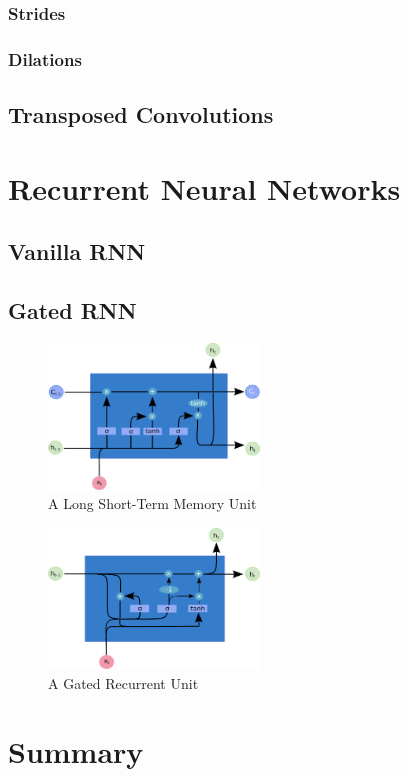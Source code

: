 \subsubsection{Strides}
\subsubsection{Dilations}
\subsection{Transposed Convolutions}


\section{Recurrent Neural Networks}
\subsection{Vanilla RNN}
\subsection{Gated RNN}

\begin{figure}
	\centering
	\includegraphics[width=0.5\textwidth]{Figs/intro2dl/LSTM.png}
	
	\caption{A Long Short-Term Memory Unit}
	\label{fig:lstm}
\end{figure}

\begin{figure}
	\centering
	\includegraphics[width=0.5\textwidth]{Figs/intro2dl/GRU.png}
	
	\caption{A Gated Recurrent Unit}
	\label{fig:gru}
\end{figure}



\section{Summary}
